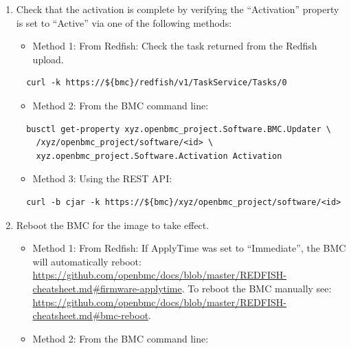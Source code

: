 \begin{enumerate}
  \begin{itemize}
  \tightlist
  \item
    Method 3: Using the REST API:
  \end{itemize}

\begin{verbatim}
  curl -b cjar -k https://${bmc}/xyz/openbmc_project/software/<id>/attr/Progress
\end{verbatim}
\item
  Check that the activation is complete by verifying the ``Activation''
  property is set to ``Active'' via one of the following methods:

  \begin{itemize}
  \tightlist
  \item
    Method 1: From Redfish: Check the task returned from the Redfish
    upload.
  \end{itemize}

\begin{verbatim}
  curl -k https://${bmc}/redfish/v1/TaskService/Tasks/0
\end{verbatim}

  \begin{itemize}
  \tightlist
  \item
    Method 2: From the BMC command line:
  \end{itemize}

\begin{verbatim}
  busctl get-property xyz.openbmc_project.Software.BMC.Updater \
    /xyz/openbmc_project/software/<id> \
    xyz.openbmc_project.Software.Activation Activation
\end{verbatim}

  \begin{itemize}
  \tightlist
  \item
    Method 3: Using the REST API:
  \end{itemize}

\begin{verbatim}
  curl -b cjar -k https://${bmc}/xyz/openbmc_project/software/<id>
\end{verbatim}
\item
  Reboot the BMC for the image to take effect.

  \begin{itemize}
  \item
    Method 1: From Redfish: If ApplyTime was set to ``Immediate'', the
    BMC will automatically reboot:
    \url{https://github.com/openbmc/docs/blob/master/REDFISH-cheatsheet.md\#firmware-applytime}.
    To reboot the BMC manually see:
    \url{https://github.com/openbmc/docs/blob/master/REDFISH-cheatsheet.md\#bmc-reboot}.
  \item
    Method 2: From the BMC command line:
  \end{itemize}


\end{enumerate}
